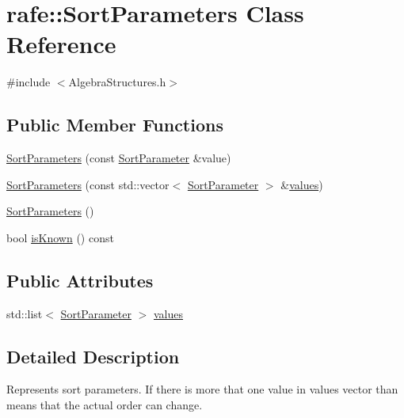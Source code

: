 \hypertarget{classrafe_1_1_sort_parameters}{\section{rafe\+:\+:Sort\+Parameters Class Reference}
\label{classrafe_1_1_sort_parameters}
}


{\ttfamily \#include $<$Algebra\+Structures.\+h$>$}

\subsection*{Public Member Functions}
\begin{DoxyCompactItemize}
\item 
\hyperlink{classrafe_1_1_sort_parameters_a97ba47d4fcbfa7280139cc9039392ed8}{Sort\+Parameters} (const \hyperlink{classrafe_1_1_sort_parameter}{Sort\+Parameter} \&value)
\item 
\hyperlink{classrafe_1_1_sort_parameters_aaa89f029adf5573f3334015b03d6d93d}{Sort\+Parameters} (const std\+::vector$<$ \hyperlink{classrafe_1_1_sort_parameter}{Sort\+Parameter} $>$ \&\hyperlink{classrafe_1_1_sort_parameters_a702fc8395a31ce5f4f83fb960cd0de44}{values})
\item 
\hyperlink{classrafe_1_1_sort_parameters_ae31a9cda44dc60f631c3cac9e2ed2610}{Sort\+Parameters} ()
\item 
bool \hyperlink{classrafe_1_1_sort_parameters_aeaa22b9a988f59b71c52dc01b09601e0}{is\+Known} () const 
\end{DoxyCompactItemize}
\subsection*{Public Attributes}
\begin{DoxyCompactItemize}
\item 
std\+::list$<$ \hyperlink{classrafe_1_1_sort_parameter}{Sort\+Parameter} $>$ \hyperlink{classrafe_1_1_sort_parameters_a702fc8395a31ce5f4f83fb960cd0de44}{values}
\end{DoxyCompactItemize}


\subsection{Detailed Description}
Represents sort parameters. If there is more that one value in values vector than means that the actual order can change. 

